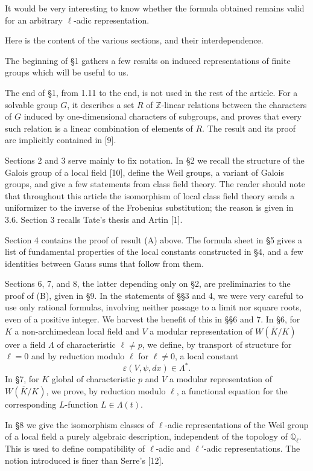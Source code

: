 \documentclass[10pt,letterpaper]{article}
\newcommand{\Q}{\mathbb Q}
\newcommand{\Z}{\mathbb Z}
\begin{document}
It would be very interesting to know whether the formula obtained remains valid for an arbitrary \(\ell\)-adic representation.

Here is the content of the various sections, and their interdependence.

The beginning of §1 gathers a few results on induced representations of finite groups which will be useful to us.

The end of §1, from 1.11 to the end, is not used in the rest of the article. For a solvable group \(G\), it describes a set \(R\) of \(\Z\)-linear relations between the characters of \(G\) induced by one-dimensional characters of subgroups, and proves that every such relation is a linear combination of elements of \(R\). The result and its proof are implicitly contained in [9].

Sections 2 and 3 serve mainly to fix notation. In §2 we recall the structure of the Galois group of a local field [10], define the Weil groups, a variant of Galois groups, and give a few statements from class field theory. The reader should note that throughout this article the isomorphism of local class field theory sends a uniformizer to the inverse of the Frobenius substitution; the reason is given in 3.6. Section 3 recalls Tate's thesis and Artin [1].

Section 4 contains the proof of result (A) above. The formula sheet in §5 gives a list of fundamental properties of the local constants constructed in §4, and a few identities between Gauss sums that follow from them.

Sections 6, 7, and 8, the latter depending only on §2, are preliminaries to the proof of (B), given in §9. In the statements of §§3 and 4, we were very careful to use only rational formulas, involving neither passage to a limit nor square roots, even of a positive integer. We harvest the benefit of this in §§6 and 7. In §6, for \(K\) a non-archimedean local field and \(V\) a modular representation of \(W(\overline K/K)\) over a field \(\Lambda\) of characteristic \(\ell\ne p\), we define, by transport of structure for \(\ell=0\) and by reduction modulo \(\ell\) for \(\ell\ne0\), a local constant
\[
\varepsilon(V,\psi,dx)\in \Lambda^*.
\]
In §7, for \(K\) global of characteristic \(p\) and \(V\) a modular representation of \(W(\overline K/K)\), we prove, by reduction modulo \(\ell\), a functional equation for the corresponding \(L\)-function \(L\in\Lambda(t)\).

In §8 we give the isomorphism classes of \(\ell\)-adic representations of the Weil group of a local field a purely algebraic description, independent of the topology of \(\Q_\ell\). This is used to define compatibility of \(\ell\)-adic and \(\ell'\)-adic representations. The notion introduced is finer than Serre's [12].
\end{document}
